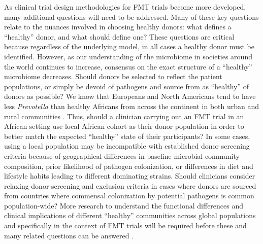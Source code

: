 As clinical trial design methodologies for FMT trials become more developed, many additional questions will need to be addressed.
Many of these key questions relate to the nuances involved in choosing healthy donors: what defines a ``healthy'' donor, and what should define one?
These questions are critical because regardless of the underlying model, in all cases a healthy donor must be identified.
However, as our understanding of the microbiome in societies around the world continues to increase, consensus on the exact structure of a “healthy” microbiome decreases.
Should donors be selected to reflect the patient populations, or simply be devoid of pathogens and source from as ``healthy'' of donors as possible?
We know that Europeans and North Americans tend to have less \textit{Prevotella} than healthy Africans from across the continent in both urban and rural communities \cite{Yatsunenko2012,Ou2013,DeFilippo2010}.
Thus, should a clinician carrying out an FMT trial in an African setting use local African cohort as their donor population in order to better match the expected ``healthy'' state of their participants?
In some cases, using a local population may be incompatible with established donor screening criteria because of geographical differences in baseline microbial community composition, prior likelihood of pathogen colonization, or differences in diet and lifestyle habits leading to different dominating strains.
Should clinicians consider relaxing donor screening and exclusion criteria in cases where donors are sourced from countries where commensal colonization by potential pathogens is common population-wide?
More research to understand the functional differences and clinical implications of different ``healthy'' communities across global populations and specifically in the context of FMT trials will be required before these and many related questions can be answered \cite{Bello2018,Rabesandratana2018}.

